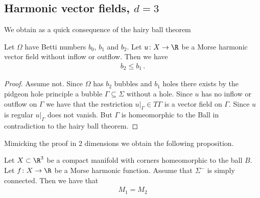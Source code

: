 \subsection{Harmonic vector fields, $d=3$}
We obtain as a quick consequence of the hairy ball theorem
\begin{proposition}
  Let $\Omega$ have Betti numbers $b_0$, $b_1$ and $b_2$.
  Let $u\colon X\to\R$
  be a Morse harmonic vector field without inflow or outflow. Then we have
  \begin{align*}
    b_2\leq b_1\,.
  \end{align*}
\end{proposition}
\begin{proof}
  Assume not. Since $\Omega$ has $b_2$ bubbles and $b_1$ holes there exists by the pidgeon hole
  principle a bubble $\Gamma\subseteq\Sigma$ without a hole. Since $u$ has no inflow or outflow on $\Gamma$ we
  have that the restriction $u\vert_\Gamma\in T\Gamma$ is a vector field on $\Gamma$. Since $u$ is regular
  $u\vert_\Gamma$ does not vanish. But $\Gamma$ is homeomorphic to the Ball in contradiction to the hairy ball theorem.
\end{proof}
Mimicking the proof in 2 dimensions we obtain the following proposition.
\begin{proposition}
  Let $X\subset\R^3$ be a compact manifold with corners homeomorphic to the ball $B$.
  Let $f\colon X\to\R$ be a Morse harmonic function. Assume that $\Sigma^-$ is simply connected.
  Then we have that
  \begin{align*}
    M_1=M_2
  \end{align*}
\end{proposition}
